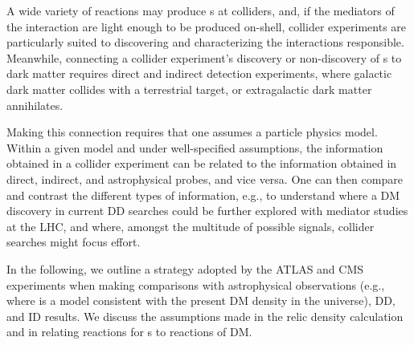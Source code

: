 A wide variety of reactions may produce {\IP}s at colliders, and, if the mediators of the interaction are light enough to be produced on-shell, collider experiments are particularly suited to discovering and characterizing the interactions responsible.  Meanwhile, connecting a collider experiment's discovery or non-discovery of {\IP}s to dark matter requires direct and indirect detection experiments, where galactic dark matter collides with a terrestrial target, or extragalactic dark matter annihilates.

Making this connection requires that one assumes a particle physics model.
Within a given model and under well-specified assumptions, the information obtained in a collider experiment can be related to the information obtained in direct, indirect, and astrophysical probes, and vice versa.
One can then compare and contrast the different types of information, e.g., to understand where a DM discovery in current DD searches could be further explored with mediator studies at the LHC, and where, amongst the multitude of possible signals, collider searches might focus effort.

In the following, we outline a strategy adopted by the ATLAS and CMS experiments when making comparisons with astrophysical observations (e.g., where is a model consistent with the present DM density in the universe), DD, and ID results. We discuss the assumptions made in the relic density calculation and in relating reactions for {\IP}s to reactions of DM.




